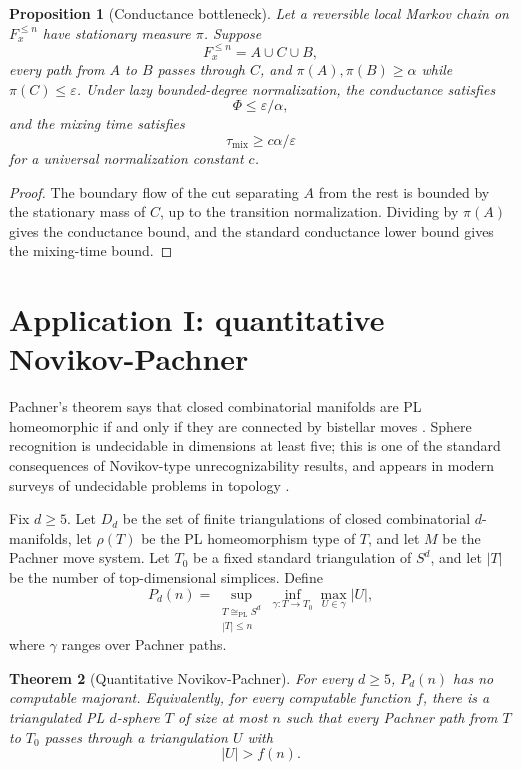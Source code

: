 \documentclass[11pt]{article}
\newtheorem{theorem}{Theorem}[section]
\newtheorem{proposition}[theorem]{Proposition}
\begin{document}
\begin{proposition}[Conductance bottleneck]
Let a reversible local Markov chain on \(F_x^{\le n}\) have stationary measure \(\pi\).  Suppose
\[
F_x^{\le n}=A\cup C\cup B,
\]
every path from \(A\) to \(B\) passes through \(C\), and \(\pi(A),\pi(B)\ge\alpha\) while \(\pi(C)\le\varepsilon\).  Under lazy bounded-degree normalization, the conductance satisfies
\[
\Phi\le \varepsilon/\alpha,
\]
and the mixing time satisfies
\[
\tau_{\mathrm{mix}}\ge c\alpha/\varepsilon
\]
for a universal normalization constant \(c\).
\end{proposition}

\begin{proof}
The boundary flow of the cut separating \(A\) from the rest is bounded by the stationary mass of \(C\), up to the transition normalization.  Dividing by \(\pi(A)\) gives the conductance bound, and the standard conductance lower bound gives the mixing-time bound.
\end{proof}

\section{Application I: quantitative Novikov-Pachner}

Pachner's theorem says that closed combinatorial manifolds are PL homeomorphic if and only if they are connected by bistellar moves \cite{pachner}.  Sphere recognition is undecidable in dimensions at least five; this is one of the standard consequences of Novikov-type unrecognizability results, and appears in modern surveys of undecidable problems in topology \cite{poonensurvey}.

Fix \(d\ge5\).  Let \(D_d\) be the set of finite triangulations of closed combinatorial \(d\)-manifolds, let \(\rho(T)\) be the PL homeomorphism type of \(T\), and let \(M\) be the Pachner move system.  Let \(T_0\) be a fixed standard triangulation of \(S^d\), and let \(|T|\) be the number of top-dimensional simplices.  Define
\[
P_d(n)=
\sup_{\substack{T\cong_{\mathrm{PL}}S^d\\ |T|\le n}}
\inf_{\gamma:T\to T_0}
\max_{U\in\gamma}|U|,
\]
where \(\gamma\) ranges over Pachner paths.

\begin{theorem}[Quantitative Novikov-Pachner]
For every \(d\ge5\), \(P_d(n)\) has no computable majorant.  Equivalently, for every computable function \(f\), there is a triangulated PL \(d\)-sphere \(T\) of size at most \(n\) such that every Pachner path from \(T\) to \(T_0\) passes through a triangulation \(U\) with
\[
|U|>f(n).
\]
\end{theorem}
\end{document}
